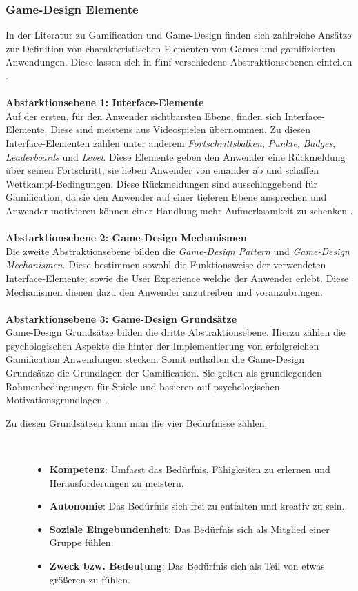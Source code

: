 \documentclass[a4paper,12pt]{scrartcl}
\begin{document}
\subsubsection{Game-Design Elemente}
In der Literatur zu Gamification und Game-Design finden sich zahlreiche Ansätze zur Definition von charakteristischen Elementen von Games und gamifizierten Anwendungen. Diese lassen sich in fünf verschiedene Abstraktionsebenen einteilen \cite{Deterding2011}.
\\\\
\textbf{Abstarktionsebene 1: Interface-Elemente}\\
Auf der ersten, für den Anwender sichtbarsten Ebene, finden sich Interface-Elemente. Diese sind meistens aus Videospielen übernommen. Zu diesen Interface-Elementen zählen unter anderem \textit{Fortschrittsbalken}, \textit{Punkte}, \textit{Badges}, \textit{Leaderboards} und \textit{Level}. Diese Elemente geben den Anwender eine Rückmeldung über seinen Fortschritt, sie heben Anwender von einander ab und schaffen Wettkampf-Bedingungen. Diese Rückmeldungen sind ausschlaggebend für Gamification, da sie den Anwender auf einer tieferen Ebene ansprechen und Anwender motivieren können einer Handlung mehr Aufmerksamkeit zu schenken \cite{GameElemente2018}.
\\\\
\textbf{Abstarktionsebene 2: Game-Design Mechanismen}\\
Die zweite Abstraktionsebene bilden die \textit{Game-Design Pattern} und \textit{Game-Design Mechanismen}. Diese bestimmen sowohl die Funktionsweise der verwendeten Interface-Elemente, sowie die User Experience welche der Anwender erlebt. Diese Mechanismen dienen dazu den Anwender anzutreiben und voranzubringen.
\\\\
\textbf{Abstarktionsebene 3: Game-Design Grundsätze}\\
Game-Design Grundsätze bilden die dritte Abstraktionsebene. Hierzu zählen die psychologischen Aspekte die hinter der Implementierung von erfolgreichen Gamification Anwendungen stecken. Somit enthalten die Game-Design Grundsätze die Grundlagen der Gamification. Sie gelten als grundlegenden Rahmenbedingungen für Spiele und basieren auf psychologischen Motivationsgrundlagen \cite{Werbach2012}. 
\begin{description}
   \item[Zu diesen Grundsätzen kann man die vier Bedürfnisse zählen:]~\par
   \begin{itemize}
      \item \textbf{Kompetenz}: Umfasst das Bedürfnis, Fähigkeiten zu erlernen und Herausforderungen zu meistern. 
      \item \textbf{Autonomie}: Das Bedürfnis sich frei zu entfalten und kreativ zu sein.
      \item \textbf{Soziale Eingebundenheit}: Das Bedürfnis sich als Mitglied einer Gruppe fühlen.
      \item \textbf{Zweck bzw. Bedeutung}: Das Bedürfnis sich als Teil von etwas größeren zu fühlen.
   \end{itemize}
\end{description}
\end{document}
